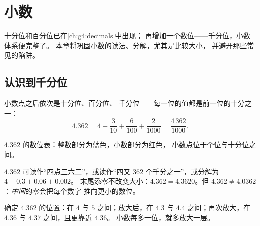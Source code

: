 \chapter{小数}\label{ch:g5:decimals}

十分位和百分位已在\cref{ch:g4:decimals}中出现；
再增加一个数位——千分位，小数体系便完整了。
本章将巩固小数的读法、分解，尤其是比较大小，
并避开那些常见的陷阱。

\section{认识到千分位}

\begin{definition}[小数的数位]\label{def:g5:decimals:places}
小数点之后依次是十分位、百分位、
千分位——每一位的值都是前一位的十分之一：
\[
4.362 = 4 + \frac{3}{10} + \frac{6}{100} + \frac{2}{1000}
= \frac{4\,362}{1000}.
\]
\end{definition}

\begin{omfigure}

{\small $4.362$ 的数位表：整数部分为蓝色，小数部分为红色，
小数点位于个位与十分位之间。}
\end{omfigure}

\begin{example}\label{ex:g5:decimals:readings}
$4.362$ 可读作“四点三六二”，或读作“四又
$362$ 个千分之一”，或分解为 $4 + 0.3 + 0.06 + 0.002$。
末尾添零不改变大小：$4.362 = 4.3620$。但
$4.362 \neq 4.0362$：\emph{中间}的零会把每个数字
推向更小的数位。
\end{example}

\begin{example}[它在数轴上的位置]\label{ex:g5:decimals:line}
确定 $4.362$ 的位置：在 $4$ 与 $5$ 之间；放大后，在 $4.3$ 与
$4.4$ 之间；再次放大，在 $4.36$ 与 $4.37$ 之间，且更靠近 $4.36$。
小数每多一位，就多放大一层。
\end{example}

